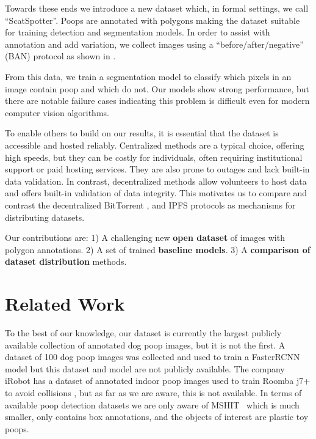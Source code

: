 \documentclass{article}
\begin{document}
Towards these ends we introduce a new dataset which, 
in formal settings, we call ``ScatSpotter''.
Poops are annotated with polygons making the dataset suitable for training detection and segmentation
  models.
In order to assist with annotation and add variation, we collect images using a ``before/after/negative'' (BAN)
  protocol as shown in .

From this data, we train a segmentation model to classify which pixels in an image contain poop and which do
  not.
Our models show strong performance, but there are notable failure cases indicating this problem is difficult
  even for modern computer vision algorithms.

To enable others to build on our results, it is essential that the dataset is accessible and hosted
  reliably.
Centralized methods are a typical choice, offering high speeds, but they can be costly for individuals,
  often requiring institutional support or paid hosting services.
They are also prone to outages and lack built-in data validation.
In contrast, decentralized methods allow volunteers to host data and offers built-in validation of data
  integrity.
This motivates us to compare and contrast the decentralized BitTorrent \cite{cohen_incentives_2003}, and
  IPFS \cite{benet_ipfs_2014} protocols as mechanisms for distributing datasets.


Our contributions are:
1) A challenging new \textbf{open dataset} of images with polygon annotations.
2) A set of trained \textbf{baseline models}.
3) A \textbf{comparison of dataset distribution} methods.


\section{Related Work}
\label{sec:relatedwork}

To the best of our knowledge, our dataset is currently the largest publicly available collection of
  annotated dog poop images, but it is not the first.
A dataset of 100 dog poop images was collected and used to train a FasterRCNN model
  \cite{neeraj_madan_dog_2019} but this dataset and model are not publicly available.
The company iRobot has a dataset of annotated indoor poop images used to train Roomba j7+ to avoid
  collisions \cite{roomba_2021}, but as far as we are aware, this is not available.
In terms of available poop detection datasets we are only aware of MSHIT~\cite{mshit_2020} which is much
  smaller, only contains box annotations, and the objects of interest are plastic toy poops.
\end{document}

